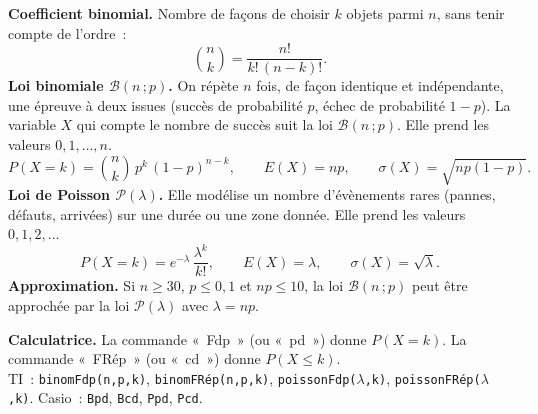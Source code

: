 \documentclass[a4paper,11pt]{article}
\begin{document}
\begin{rappel}
\textbf{Coefficient binomial.} Nombre de façons de choisir $k$ objets parmi $n$, sans tenir compte de l'ordre~:
\[
\binom{n}{k} = \frac{n!}{k!\,(n-k)!}.
\]
\textbf{Loi binomiale $\mathcal{B}(n\,;p)$.} On répète $n$ fois, de façon identique et indépendante, une épreuve à deux issues (succès de probabilité $p$, échec de probabilité $1-p$). La variable $X$ qui compte le nombre de succès suit la loi $\mathcal{B}(n\,;p)$. Elle prend les valeurs $0, 1, \dots, n$.
\[
P(X = k) = \binom{n}{k}\,p^{k}\,(1-p)^{n-k},\qquad E(X) = np,\qquad \sigma(X) = \sqrt{np(1-p)}.
\]
\textbf{Loi de Poisson $\mathcal{P}(\lambda)$.} Elle modélise un nombre d'évènements rares (pannes, défauts, arrivées) sur une durée ou une zone donnée. Elle prend les valeurs $0, 1, 2, \dots$
\[
P(X = k) = e^{-\lambda}\,\frac{\lambda^{k}}{k!},\qquad E(X) = \lambda,\qquad \sigma(X) = \sqrt{\lambda}.
\]
\textbf{Approximation.} Si $n \geq 30$, $p \leq 0{,}1$ et $np \leq 10$, la loi $\mathcal{B}(n\,;p)$ peut être approchée par la loi $\mathcal{P}(\lambda)$ avec $\lambda = np$.

\smallskip
\textbf{Calculatrice.} La commande «~Fdp~» (ou «~pd~») donne $P(X = k)$. La commande «~FRép~» (ou «~cd~») donne $P(X \leq k)$.\\
{\small TI~: \texttt{binomFdp(n,p,k)}, \texttt{binomFRép(n,p,k)}, \texttt{poissonFdp($\lambda$,k)}, \texttt{poissonFRép($\lambda$,k)}. \quad Casio~: \texttt{Bpd}, \texttt{Bcd}, \texttt{Ppd}, \texttt{Pcd}.}
\end{rappel}

\newpage
\end{document}
